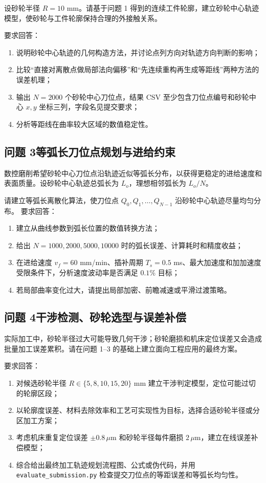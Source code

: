 \documentclass[UTF8,a4paper,11pt]{ctexart}
\begin{document}
设砂轮半径 $R=10$ mm。请基于问题 1 得到的连续工件轮廓，建立砂轮中心轨迹模型，使砂轮与工件轮廓保持合理的外接触关系。

要求回答：
\begin{enumerate}
  \item 说明砂轮中心轨迹的几何构造方法，并讨论点列方向对轨迹方向判断的影响；
  \item 比较“直接对离散点做局部法向偏移”和“先连续重构再生成等距线”两种方法的误差机理；
  \item 输出 $N=2000$ 个砂轮中心刀位点，结果 CSV 至少包含刀位点编号和砂轮中心 $x,y$ 坐标三列，字段名见提交要求；
  \item 分析等距线在曲率较大区域的数值稳定性。
\end{enumerate}

\subsection*{问题 3\quad 等弧长刀位点规划与进给约束}

数控磨削希望砂轮中心刀位点沿轨迹近似等弧长分布，以获得更稳定的进给速度和表面质量。设砂轮中心轨迹总弧长为 $L_o$，理想相邻弧长为 $L_o/N$。

请建立等弧长离散化算法，使刀位点 $Q_0,Q_1,\ldots,Q_{N-1}$ 沿砂轮中心轨迹尽量均匀分布。
要求回答：
\begin{enumerate}
  \item 建立从曲线参数到弧长位置的数值转换方法；
  \item 给出 $N=1000,2000,5000,10000$ 时的弧长误差、计算耗时和精度收益；
  \item 在进给速度 $v_f=60$ mm/min、插补周期 $T_s=0.5$ ms、最大加速度和加加速度受限条件下，分析速度波动率是否满足 $0.1\%$ 目标；
  \item 若局部曲率变化过大，请提出局部加密、前瞻减速或平滑过渡策略。
\end{enumerate}

\subsection*{问题 4\quad 干涉检测、砂轮选型与误差补偿}

实际加工中，砂轮半径过大可能导致几何干涉；砂轮磨损和机床定位误差又会造成批量加工误差累积。请在问题 1--3 的基础上建立面向工程应用的最终方案。

要求回答：
\begin{enumerate}
  \item 对候选砂轮半径 $R\in\{5,8,10,15,20\}$ mm 建立干涉判定模型，定位可能过切的轮廓区段；
  \item 以轮廓度误差、材料去除效率和工艺可实现性为目标，选择合适砂轮半径或分区加工方案；
  \item 考虑机床重复定位误差 $\pm0.8\,\mu$m 和砂轮半径每件磨损 $2\,\mu$m，建立在线误差补偿模型；
  \item 综合给出最终加工轨迹规划流程图、公式或伪代码，并用 \texttt{evaluate\_submission.py} 检查提交刀位点的等距误差和等弧长均匀性。
\end{enumerate}
\end{document}
